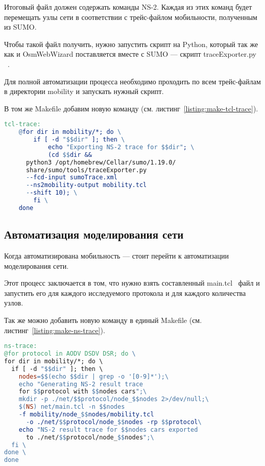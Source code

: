 Итоговый файл должен содержать команды NS-2. Каждая из этих команд будет перемещать узлы сети в соответствии с трейс-файлом мобильности, полученным из SUMO.

Чтобы такой файл получить, нужно запустить скрипт на Python, который так же как и OsmWebWizard поставляется вместе с SUMO --- скрипт traceExporter.py ~\cite{traceexporter}.

Для полной автоматизации процесса необходимо проходить по всем трейс-файлам в директории mobility и запускать нужный скрипт.

В том же Makefile добавим новую команду (см. листинг~\ref{listing:make-tcl-trace}).

\begin{lstlisting}[language=make, style=mystyle, caption=Makefile для конвертации трейс-файла, label=listing:make-tcl-trace]
tcl-trace:
	@for dir in mobility/*; do \
		if [ -d "$$dir" ]; then \
			echo "Exporting NS-2 trace for $$dir"; \
			(cd $$dir && 
      python3 /opt/homebrew/Cellar/sumo/1.19.0/
      share/sumo/tools/traceExporter.py 
      --fcd-input sumoTrace.xml 
      --ns2mobility-output mobility.tcl 
      --shift 10); \
		fi \
	done
\end{lstlisting}

\subsection{Автоматизация моделирования сети}

Когда автоматизирована мобильность --- стоит перейти к автоматизации моделирования сети.

Этот процесс заключается в том, что нужно взять составленный main.tcl~\cite{ns2_examples} файл и запустить его для каждого исследуемого протокола и для каждого количества узлов.

Так же можно добавить новую команду в единый Makefile (см. листинг~\ref{listing:make-ns-trace}).

\begin{lstlisting}[language=make, style=mystyle, caption=Makefile для запуска симуляции сети, label=listing:make-ns-trace]
ns-trace:
@for protocol in AODV DSDV DSR; do \
for dir in mobility/*; do \
  if [ -d "$$dir" ]; then \
    nodes=$$(echo $$dir | grep -o '[0-9]*');\
    echo "Generating NS-2 result trace 
    for $$protocol with $$nodes cars";\
    mkdir -p ./net/$$protocol/node_$$nodes 2>/dev/null;\
    $(NS) net/main.tcl -n $$nodes 
    -f mobility/node_$$nodes/mobility.tcl
      -o ./net/$$protocol/node_$$nodes -rp $$protocol\
    echo "NS-2 result trace for $$nodes cars exported
      to ./net/$$protocol/node_$$nodes";\
  fi \
done \
done
\end{lstlisting}

